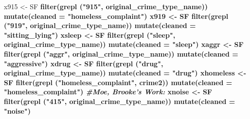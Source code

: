 \documentclass[]{book}
\newenvironment{Shaded}{\begin{snugshade}}{\end{snugshade}}
\newcommand{\CommentTok}[1]{\textcolor[rgb]{0.56,0.35,0.01}{\textit{#1}}}
\newcommand{\DataTypeTok}[1]{\textcolor[rgb]{0.13,0.29,0.53}{#1}}
\newcommand{\KeywordTok}[1]{\textcolor[rgb]{0.13,0.29,0.53}{\textbf{#1}}}
\newcommand{\NormalTok}[1]{#1}
\newcommand{\OperatorTok}[1]{\textcolor[rgb]{0.81,0.36,0.00}{\textbf{#1}}}
\newcommand{\StringTok}[1]{\textcolor[rgb]{0.31,0.60,0.02}{#1}}
\begin{document}
\begin{Shaded}
\begin{Highlighting}[]
\NormalTok{x915 <-}\StringTok{ }\NormalTok{SF }\OperatorTok{%
\StringTok{  }\KeywordTok{filter}\NormalTok{(}\KeywordTok{grepl}\NormalTok{ (}\StringTok{"915"}\NormalTok{, original_crime_type_name)) }\OperatorTok{%
\StringTok{  }\KeywordTok{mutate}\NormalTok{(}\DataTypeTok{cleaned =} \StringTok{"homeless_complaint"}\NormalTok{)}
\NormalTok{x919 <-}\StringTok{ }\NormalTok{SF }\OperatorTok{%
\StringTok{  }\KeywordTok{filter}\NormalTok{(}\KeywordTok{grepl}\NormalTok{ (}\StringTok{"919"}\NormalTok{, original_crime_type_name)) }\OperatorTok{%
\StringTok{  }\KeywordTok{mutate}\NormalTok{(}\DataTypeTok{cleaned =} \StringTok{"sitting_lying"}\NormalTok{)}
\NormalTok{xsleep <-}\StringTok{ }\NormalTok{SF }\OperatorTok{%
\StringTok{  }\KeywordTok{filter}\NormalTok{(}\KeywordTok{grepl}\NormalTok{ (}\StringTok{"sleep"}\NormalTok{, original_crime_type_name)) }\OperatorTok{%
\StringTok{  }\KeywordTok{mutate}\NormalTok{(}\DataTypeTok{cleaned =} \StringTok{"sleep"}\NormalTok{)}
\NormalTok{xaggr <-}\StringTok{ }\NormalTok{SF }\OperatorTok{%
\StringTok{  }\KeywordTok{filter}\NormalTok{(}\KeywordTok{grepl}\NormalTok{ (}\StringTok{"aggr"}\NormalTok{, original_crime_type_name)) }\OperatorTok{%
\StringTok{  }\KeywordTok{mutate}\NormalTok{(}\DataTypeTok{cleaned =} \StringTok{"aggressive"}\NormalTok{)}
\NormalTok{xdrug <-}\StringTok{ }\NormalTok{SF }\OperatorTok{%
\StringTok{  }\KeywordTok{filter}\NormalTok{(}\KeywordTok{grepl}\NormalTok{ (}\StringTok{"drug"}\NormalTok{, original_crime_type_name)) }\OperatorTok{%
\StringTok{  }\KeywordTok{mutate}\NormalTok{(}\DataTypeTok{cleaned =} \StringTok{"drug"}\NormalTok{)}
\NormalTok{xhomeless <-}\StringTok{ }\NormalTok{SF }\OperatorTok{%
\StringTok{  }\KeywordTok{filter}\NormalTok{(}\KeywordTok{grepl}\NormalTok{ (}\StringTok{"homeless_complaint"}\NormalTok{, crime2)) }\OperatorTok{%
\StringTok{  }\KeywordTok{mutate}\NormalTok{(}\DataTypeTok{cleaned =} \StringTok{"homeless_complaint"}\NormalTok{)}
\CommentTok{#Moe, Brooke's Work: }
\NormalTok{xnoise <-}\StringTok{ }\NormalTok{SF }\OperatorTok{%
\StringTok{  }\KeywordTok{filter}\NormalTok{(}\KeywordTok{grepl}\NormalTok{ (}\StringTok{"415"}\NormalTok{, original_crime_type_name)) }\OperatorTok{%
\StringTok{  }\KeywordTok{mutate}\NormalTok{(}\DataTypeTok{cleaned =} \StringTok{"noise"}\NormalTok{)}
}}}}}}}}}}}}}}
\end{Highlighting}
\end{Shaded}
\end{document}
